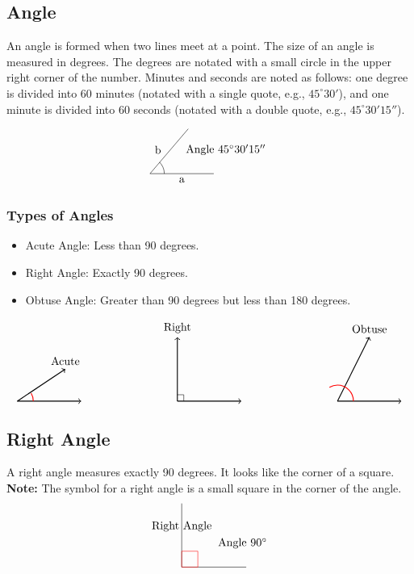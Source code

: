 \subsection{Angle}
An angle is formed when two lines meet at a point. The size of an angle is measured in degrees. The degrees are notated with a small circle in the upper right corner of the number. Minutes and seconds are noted as follows: one degree is divided into 60 minutes (notated with a single quote, e.g., \(45^\circ 30'\)), and one minute is divided into 60 seconds (notated with a double quote, e.g., \(45^\circ 30' 15''\)).

\[
\begin{tikzpicture}
    \draw (0,0) -- (2,0);
    \node[below] at (1,0) {a};
    \draw (0,0) -- (1.2,1.4);
    \node[above] at (0.25,0.5) {b};
    \node[right] at (1,0.75) {Angle \(45^\circ 30' 15''\)};
    \draw (0.45,0) arc[start angle=0, end angle=45.5042, radius=0.5];
\end{tikzpicture}
\]

\subsubsection{Types of Angles}
\begin{itemize}
    \item Acute Angle: Less than 90 degrees.
    \item Right Angle: Exactly 90 degrees.
    \item Obtuse Angle: Greater than 90 degrees but less than 180 degrees.
\end{itemize}

\[
\begin{tikzpicture}
    \draw[thick,->] (0,0) -- (2,0);
    \draw[thick,->] (0,0) -- (1.5,1) node[above] {Acute};
    \draw[red,thick] (0.5,0) arc[start angle=0, end angle=30, radius=0.5];

    \draw[thick,->] (5,0) -- (7,0);
    \draw[thick,->] (5,0) -- (5,2) node[above] {Right};
    \draw (5.2,0) -- (5.2,0.2) -- (5,0.2);

    \draw[thick,->] (10,0) -- (12,0);
    \draw[thick,->] (10,0) -- (11,2) node[above] {Obtuse};
    \draw[red,thick] (10.5,0) arc[start angle=0, end angle=120, radius=0.5];
\end{tikzpicture}
\]

\subsection{Right Angle}
A right angle measures exactly 90 degrees. It looks like the corner of a square.
\textbf{Note:} The symbol for a right angle is a small square in the corner of the angle.
\[
\begin{tikzpicture}
    \draw (0,0) -- (2,0);
    \draw (0,0) -- (0,2);
    \node[right] at (1,0.75) {Angle \(90^\circ\)};
    \node[above] at (0,1) {Right Angle};
    \draw[red] (0,0) rectangle (0.5,0.5);
\end{tikzpicture}
\]

